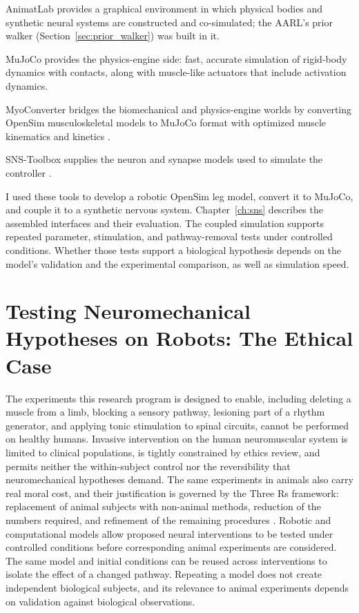 AnimatLab \citep{cofer_animatlab_2010} provides a graphical environment in which physical bodies and synthetic neural systems are constructed and co-simulated; the AARL's prior walker (Section~\ref{sec:prior_walker}) was built in it. 

MuJoCo \citep{todorov_mujoco_2012} provides the physics-engine side: fast, accurate simulation of rigid-body dynamics with contacts, along with muscle-like actuators that include activation dynamics. 

MyoConverter bridges the biomechanical and physics-engine worlds by converting OpenSim musculoskeletal models to MuJoCo format with optimized muscle kinematics and kinetics \citep{caggiano_myosuite_2022, wang_myosim_2022}. 

SNS-Toolbox supplies the neuron and synapse models used to simulate the controller \citep{nourse_sns_2023}.

I used these tools to develop a robotic OpenSim leg model, convert it to MuJoCo, and couple it to a synthetic nervous system. Chapter~\ref{ch:sns} describes the assembled interfaces and their evaluation. The coupled simulation supports repeated parameter, stimulation, and pathway-removal tests under controlled conditions. Whether those tests support a biological hypothesis depends on the model's validation and the experimental comparison, as well as simulation speed.

\section{Testing Neuromechanical Hypotheses on Robots: The Ethical Case}\label{sec:bg_ethics}

The experiments this research program is designed to enable, including deleting a muscle from a limb, blocking a sensory pathway, lesioning part of a rhythm generator, and applying tonic stimulation to spinal circuits, cannot be performed on healthy humans. Invasive intervention on the human neuromuscular system is limited to clinical populations, is tightly constrained by ethics review, and permits neither the within-subject control nor the reversibility that neuromechanical hypotheses demand. The same experiments in animals also carry real moral cost, and their justification is governed by the Three Rs framework: replacement of animal subjects with non-animal methods, reduction of the numbers required, and refinement of the remaining procedures \citep{russell_principles_1959, tannenbaum_russell_2015}. Robotic and computational models allow proposed neural interventions to be tested under controlled conditions before corresponding animal experiments are considered. The same model and initial conditions can be reused across interventions to isolate the effect of a changed pathway. Repeating a model does not create independent biological subjects, and its relevance to animal experiments depends on validation against biological observations.

